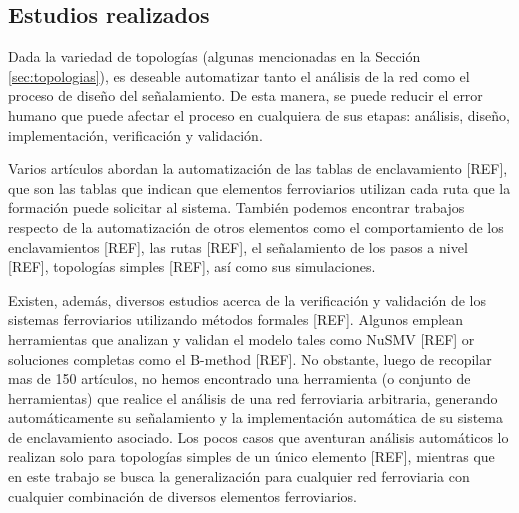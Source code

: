 \subsection{Estudios realizados}
\label{sec:estudios}
    Dada la variedad de topologías (algunas mencionadas en la Sección \ref{sec:topologias}), es deseable automatizar tanto el análisis de la red como el proceso de diseño del señalamiento. De esta manera, se puede reducir el error humano que puede afectar el proceso en cualquiera de sus etapas: análisis, diseño, implementación, verificación y validación.

    Varios artículos abordan la automatización de las tablas de enclavamiento [REF], que son las tablas que indican que elementos ferroviarios utilizan cada ruta que la formación puede solicitar al sistema. También podemos encontrar trabajos respecto de la automatización de otros elementos como el comportamiento de los enclavamientos [REF], las rutas [REF], el señalamiento de los pasos a nivel [REF], topologías simples [REF], así como sus simulaciones.

    Existen, además, diversos estudios acerca de la verificación y validación de los sistemas ferroviarios utilizando métodos formales [REF]. Algunos emplean herramientas que analizan y validan el modelo tales como NuSMV [REF] or soluciones completas como el B-method [REF]. No obstante, luego de recopilar mas de 150 artículos, no hemos encontrado una herramienta (o conjunto de herramientas) que realice el análisis de una red ferroviaria arbitraria, generando automáticamente su señalamiento y la implementación automática de su sistema de enclavamiento asociado. Los pocos casos que aventuran análisis automáticos lo realizan solo para topologías simples de un único elemento [REF], mientras que en este trabajo se busca la generalización para cualquier red ferroviaria con cualquier combinación de diversos elementos ferroviarios.